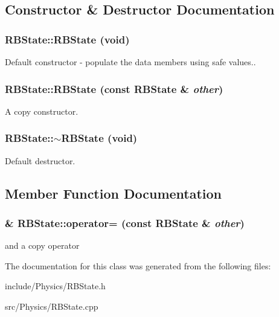 \subsection{Constructor \& Destructor Documentation}
\hypertarget{classCartWheel_1_1Physics_1_1RBState_a249b7b56d21fb43151ee309d5d097fd1}{
\subsubsection[{RBState}]{\setlength{\rightskip}{0pt plus 5cm}RBState::RBState (void)}}
\label{classCartWheel_1_1Physics_1_1RBState_a249b7b56d21fb43151ee309d5d097fd1}
Default constructor -\/ populate the data members using safe values.. \hypertarget{classCartWheel_1_1Physics_1_1RBState_acbba6a75b02312ce0faf57e172e94aa8}{
\subsubsection[{RBState}]{\setlength{\rightskip}{0pt plus 5cm}RBState::RBState (const {\bf RBState} \& {\em other})}}
\label{classCartWheel_1_1Physics_1_1RBState_acbba6a75b02312ce0faf57e172e94aa8}
A copy constructor. \hypertarget{classCartWheel_1_1Physics_1_1RBState_ab54c2648338e46616b8903973e848f8e}{
\subsubsection[{$\sim$RBState}]{\setlength{\rightskip}{0pt plus 5cm}RBState::$\sim$RBState (void)}}
\label{classCartWheel_1_1Physics_1_1RBState_ab54c2648338e46616b8903973e848f8e}
Default destructor. 

\subsection{Member Function Documentation}
\hypertarget{classCartWheel_1_1Physics_1_1RBState_a970328d7cb83ce5e4a87b52e5d9687ac}{
\subsubsection[{operator=}]{ \& RBState::operator= (const {\bf RBState} \& {\em other})}}
\label{classCartWheel_1_1Physics_1_1RBState_a970328d7cb83ce5e4a87b52e5d9687ac}
and a copy operator 

The documentation for this class was generated from the following files:\begin{DoxyCompactItemize}
\item 
include/Physics/RBState.h\item 
src/Physics/RBState.cpp\end{DoxyCompactItemize}
